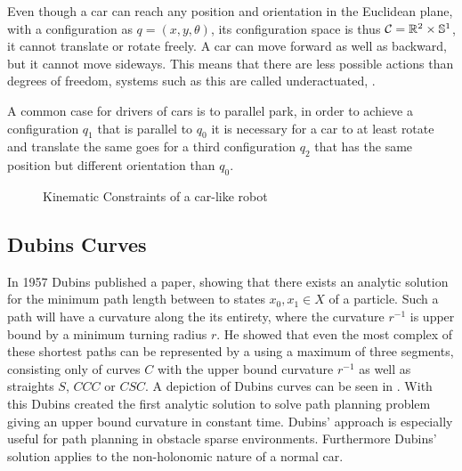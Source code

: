 Even though a car can reach any position and orientation in the Euclidean plane, with a configuration as $q = (x,y,\theta)$, its configuration space is thus $\mathcal{C} = \mathbb{R}^2 \times \mathbb{S}^1$, it cannot translate or rotate freely. A car can move forward as well as backward, but it cannot move sideways. This means that there are less possible actions than degrees of freedom, systems such as this are called underactuated, \cite{LaValle.2006}.

A common case for drivers of cars is to parallel park, in order to achieve a configuration $q_1$ that is parallel to $q_0$ it is necessary for a car to at least rotate and translate the same goes for a third configuration $q_2$ that has the same position but different orientation than $q_0$. \cite{Latombe.1991}

\begin{figure}[h]
    \caption{Kinematic Constraints of a car-like robot}
    \label{fig:kinematicConstraints}
\end{figure}

\subsection{Dubins Curves}
In 1957 Dubins published a paper, showing that there exists an analytic solution for the minimum path length between to states $x_0, x_1 \in X$ of a particle. Such a path will have a curvature along the its entirety, where the curvature $r^{-1}$ is upper bound by a minimum turning radius $r$. He showed that even the most complex of these shortest paths can be represented by a using a maximum of three segments, consisting only of curves $C$ with the upper bound curvature $r^{-1}$ as well as straights $S$, $CCC$ or $CSC$. A depiction of Dubins curves can be seen in  .  \cite{Dubins.1957} With this Dubins created the first analytic solution to solve path planning problem giving an upper bound curvature in constant time. Dubins' approach is especially useful for path planning in obstacle sparse environments. Furthermore Dubins' solution applies to the non-holonomic nature of a normal car.


